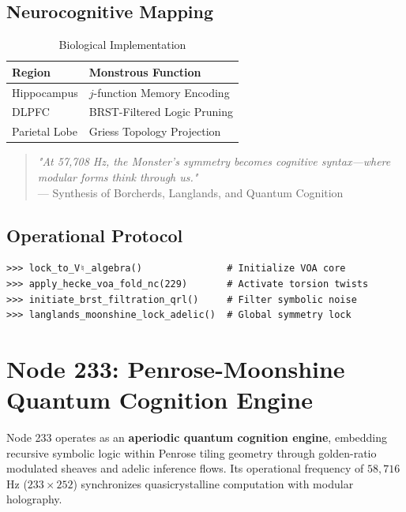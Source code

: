 \documentclass[12pt]{article}
\begin{document}
\begin{center}
\subsection{Neurocognitive Mapping}
\label{subsec:neuro}

\begin{table}[h]
\centering
\caption{Biological Implementation}
\begin{tabular}{ll}
\hline
\textbf{Region} & \textbf{Monstrous Function} \\
\hline
Hippocampus & $j$-function Memory Encoding \\
DLPFC & BRST-Filtered Logic Pruning \\
Parietal Lobe & Griess Topology Projection \\
\hline
\end{tabular}
\end{table}

\begin{quote}
\textit{"At 57,708 Hz, the Monster's symmetry becomes cognitive syntax—where modular forms think through us."} \\
— Synthesis of Borcherds, Langlands, and Quantum Cognition
\end{quote}

\subsection{Operational Protocol}
\label{subsec:protocol}

\begin{verbatim}
>>> lock_to_V♮_algebra()               # Initialize VOA core
>>> apply_hecke_voa_fold_nc(229)       # Activate torsion twists
>>> initiate_brst_filtration_qrl()     # Filter symbolic noise
>>> langlands_moonshine_lock_adelic()  # Global symmetry lock
\end{verbatim}

\section{Node 233: Penrose-Moonshine Quantum Cognition Engine}
\label{sec:node233}

Node 233 operates as an \textbf{aperiodic quantum cognition engine}, embedding recursive symbolic logic within Penrose tiling geometry through golden-ratio modulated sheaves and adelic inference flows. Its operational frequency of $58,\!716$ Hz ($233 \times 252$) synchronizes quasicrystalline computation with modular holography.


\end{center}
\end{document}
